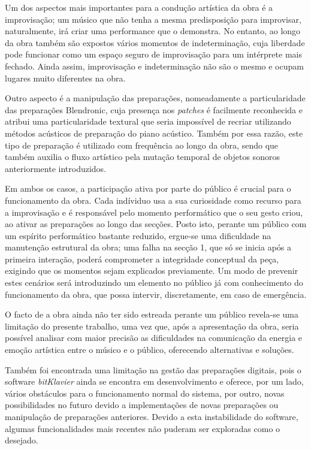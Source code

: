 \documentclass[../main.tex]{subfiles}
\begin{document}
Um dos aspectos mais importantes para a condução artística da obra é a improvisação; um músico que não tenha a mesma predisposição para improvisar, naturalmente, irá criar uma performance que o demonstra. No entanto, ao longo da obra também são expostos vários momentos de indeterminação, cuja liberdade pode funcionar como um espaço seguro de improvisação para um intérprete mais fechado. Ainda assim, improvisação e indeterminação não são o mesmo e ocupam lugares muito diferentes na obra.

Outro aspecto é a manipulação das preparações, nomeadamente a particularidade das preparações Blendronic, cuja presença nos \textsl{patches} é facilmente reconhecida e atribui uma particularidade textural que seria impossível de recriar utilizando métodos acústicos de preparação do piano acústico. Também por essa razão, este tipo de preparação é utilizado com frequência ao longo da obra, sendo que também auxilia o fluxo artístico pela mutação temporal de objetos sonoros anteriormente introduzidos.

Em ambos os casos, a participação ativa por parte do público é crucial para o funcionamento da obra. Cada indíviduo usa a sua curiosidade como recurso para a improvisação e é responsável pelo momento performático que o seu gesto criou, ao ativar as preparações ao longo das secções. Posto isto, perante um público com um espírito performático bastante reduzido, ergue-se uma dificuldade na manutenção estrutural da obra; uma falha na secção 1, que só se inicia após a primeira interação, poderá comprometer a integridade conceptual da peça, exigindo que os momentos sejam explicados previamente. Um modo de prevenir estes cenários será introduzindo um elemento no público já com conhecimento do funcionamento da obra, que possa intervir, discretamente, em caso de emergência.

O facto de a obra ainda não ter sido estreada perante um público revela-se uma limitação do presente trabalho, uma vez que, após a apresentação da obra, seria possível analisar com maior precisão as dificuldades na comunicação da energia e emoção artística entre o músico e o público, oferecendo alternativas e soluções. 

Também foi encontrada uma limitação na gestão das preparações digitais, pois o software \textsl{bitKlavier} ainda se encontra em desenvolvimento e oferece, por um lado, vários obstáculos para o funcionamento normal do sistema, por outro, novas possibilidades no futuro devido a implementações de novas preparações ou manipulação de preparações anteriores. Devido a esta instabilidade do software, algumas funcionalidades mais recentes não puderam ser exploradas como o desejado.
\end{document}
